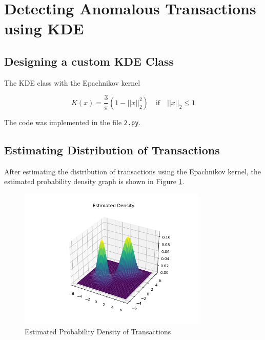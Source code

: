 \section{Detecting Anomalous Transactions using KDE}

\subsection{Designing a custom KDE Class}

The KDE class with the Epachnikov kernel

\begin{equation}
    K(x) = \frac{3}{\pi} (1 - ||x||_2^2) \quad \text{if} \quad ||x||_2 \leq 1
\end{equation}

The code was implemented in the file \texttt{2.py}.

\subsection{Estimating Distribution of Transactions}

After estimating the distribution of transactions using the Epachnikov kernel, the estimated probability density graph is shown in Figure \ref{fig:q2_1}.

\begin{figure}[H]
    \centering
    \includegraphics[width=0.8\textwidth]{../q2/images/transaction_distribution.png}
    \caption{Estimated Probability Density of Transactions}
    \label{fig:q2_1}
\end{figure}

\newpage